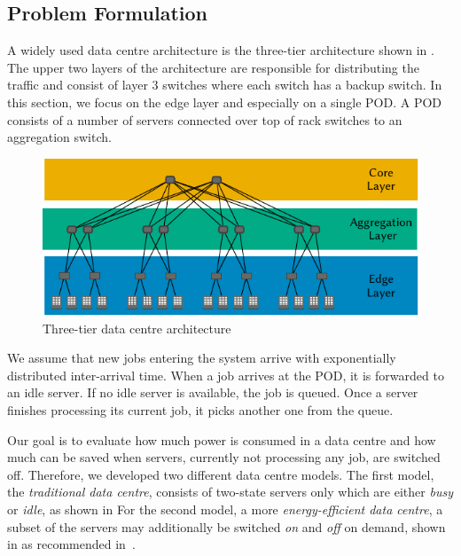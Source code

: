 \subsection{Problem Formulation}\label{sec:cloud:data_centers:problem_formulation}

A widely used data centre architecture is the three-tier architecture shown in .
The upper two layers of the architecture are responsible for distributing the traffic and consist of layer 3 switches where each switch has a backup switch.
In this section, we focus on the edge layer and especially on a single \gls{POD}.
A \gls{POD} consists of a number of servers connected over top of rack switches to an aggregation switch.

\begin{figure}
  \centering
  \includegraphics{cloud/data_centers/problem_formulation/figures/architecture}
  \caption{Three-tier data centre architecture}
  \label{fig:cloud:data_centers:problem_formulation:3-tier_datacenter}
\end{figure}

We assume that new jobs entering the system arrive with exponentially distributed inter-arrival time.
When a job arrives at the \gls{POD}, it is forwarded to an idle server.
If no idle server is available, the job is queued.
Once a server finishes processing its current job, it picks another one from the queue.

Our goal is to evaluate how much power is consumed in a data centre and how much can be saved when servers, currently not processing any job, are switched off.
Therefore, we developed two different data centre models.
The first model, the \emph{traditional data centre}, consists of two-state servers only which are either \emph{busy} or \emph{idle}, as shown in  
For the second model, a more \emph{energy-efficient data centre}, a subset of the servers may additionally be switched \emph{on} and \emph{off} on demand, shown in  as recommended in~\cite{EPA2007}.

